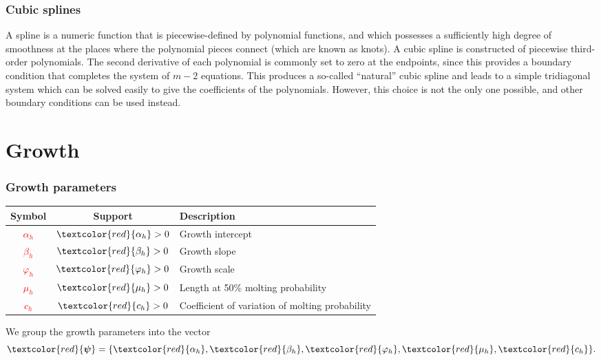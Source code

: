 \documentclass{beamer}
\begin{document}
\begin{frame}
\frametitle{Cubic splines}
A spline is a numeric function that is piecewise-defined by polynomial
functions, and which possesses a sufficiently high degree of smoothness at the
places where the polynomial pieces connect (which are known as knots). A cubic
spline is constructed of piecewise third-order polynomials. The second
derivative of each polynomial is commonly set to zero at the endpoints, since
this provides a boundary condition that completes the system of $m-2$
equations. This produces a so-called ``natural'' cubic spline and leads to a
simple tridiagonal system which can be solved easily to give the coefficients of
the polynomials. However, this choice is not the only one possible, and other
boundary conditions can be used instead.
\end{frame}


\section{Growth}


\begin{frame}
\frametitle{Growth parameters}
\begin{table}
  \centering
  \begin{tabular}{ccl}
  \hline
  Symbol & Support & Description \\
  \hline
      \textcolor{red}{$\alpha_h$} & $\textcolor{red}{\alpha_h} > 0$ & Growth intercept \\
      \textcolor{red}{$\beta_h$} & $\textcolor{red}{\beta_h} > 0$ & Growth slope \\
      \textcolor{red}{$\varphi_h$} & $\textcolor{red}{\varphi_h} > 0$ & Growth scale \\
      \textcolor{red}{$\mu_h$} & $\textcolor{red}{\mu_h} > 0$ & Length at 50\% molting probability\\
      \textcolor{red}{$c_h$} & $\textcolor{red}{c_h} > 0$ & Coefficient of variation of molting probability\\
  \hline
  \end{tabular}
\end{table}
We group the growth parameters into the vector
\begin{equation*}
  \textcolor{red}{\boldsymbol\psi} = \{ \textcolor{red}{\alpha_h}, 
  \textcolor{red}{\beta_h}, \textcolor{red}{\varphi_h}, \textcolor{red}{\mu_h},
  \textcolor{red}{c_h} \}.
\end{equation*}
\end{frame}
\end{document}
